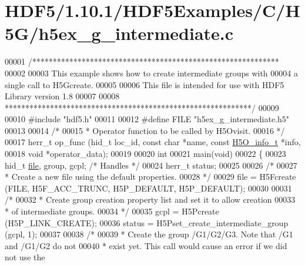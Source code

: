 \hypertarget{_h_d_f5_21_810_81_2_h_d_f5_examples_2_c_2_h5_g_2h5ex__g__intermediate_8c_source}{}\section{H\+D\+F5/1.10.1/\+H\+D\+F5\+Examples/\+C/\+H5\+G/h5ex\+\_\+g\+\_\+intermediate.c}
\label{_h_d_f5_21_810_81_2_h_d_f5_examples_2_c_2_h5_g_2h5ex__g__intermediate_8c_source}

\begin{DoxyCode}
00001 \textcolor{comment}{/************************************************************}
00002 \textcolor{comment}{}
00003 \textcolor{comment}{  This example shows how to create intermediate groups with}
00004 \textcolor{comment}{  a single call to H5Gcreate.}
00005 \textcolor{comment}{}
00006 \textcolor{comment}{  This file is intended for use with HDF5 Library version 1.8}
00007 \textcolor{comment}{}
00008 \textcolor{comment}{ ************************************************************/}
00009 
00010 \textcolor{preprocessor}{#include "hdf5.h"}
00011 
00012 \textcolor{preprocessor}{#define FILE            "h5ex\_g\_intermediate.h5"}
00013 
00014 \textcolor{comment}{/*}
00015 \textcolor{comment}{ * Operator function to be called by H5Ovisit.}
00016 \textcolor{comment}{ */}
00017 herr\_t op\_func (hid\_t loc\_id, \textcolor{keyword}{const} \textcolor{keywordtype}{char} *name, \textcolor{keyword}{const} \hyperlink{struct_h5_o__info__t}{H5O\_info\_t} *info,
00018             \textcolor{keywordtype}{void} *operator\_data);
00019 
00020 \textcolor{keywordtype}{int}
00021 main(\textcolor{keywordtype}{void})
00022 \{
00023     hid\_t       \hyperlink{structfile}{file}, group, gcpl;      \textcolor{comment}{/* Handles */}
00024     herr\_t      status;
00025 
00026     \textcolor{comment}{/*}
00027 \textcolor{comment}{     * Create a new file using the default properties.}
00028 \textcolor{comment}{     */}
00029     file = H5Fcreate (FILE, H5F\_ACC\_TRUNC, H5P\_DEFAULT, H5P\_DEFAULT);
00030 
00031     \textcolor{comment}{/*}
00032 \textcolor{comment}{     * Create group creation property list and set it to allow creation}
00033 \textcolor{comment}{     * of intermediate groups.}
00034 \textcolor{comment}{     */}
00035     gcpl = H5Pcreate (H5P\_LINK\_CREATE);
00036     status = H5Pset\_create\_intermediate\_group (gcpl, 1);
00037 
00038     \textcolor{comment}{/*}
00039 \textcolor{comment}{     * Create the group /G1/G2/G3.  Note that /G1 and /G1/G2 do not}
00040 \textcolor{comment}{     * exist yet.  This call would cause an error if we did not use the}

\end{DoxyCode}
